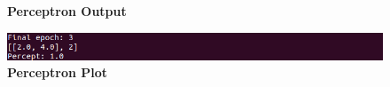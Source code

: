 \documentclass{article}
\begin{document}
\begin{figure}[!htb]
    \centering
    \textbf{Perceptron Output}\par\medskip
    \includegraphics[width=15cm]{Project 2 Perceptron}
    \newline
    \newline
    \textbf{Perceptron Plot}\par\medskip
\end{figure}
\end{document}
